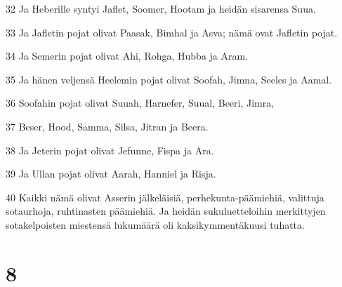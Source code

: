 \par 32 Ja Heberille syntyi Jaflet, Soomer, Hootam ja heidän sisarensa Suua.
\par 33 Ja Jafletin pojat olivat Paasak, Bimhal ja Asva; nämä ovat Jafletin pojat.
\par 34 Ja Semerin pojat olivat Ahi, Rohga, Hubba ja Aram.
\par 35 Ja hänen veljensä Heelemin pojat olivat Soofah, Jimna, Seeles ja Aamal.
\par 36 Soofahin pojat olivat Suuah, Harnefer, Suual, Beeri, Jimra,
\par 37 Beser, Hood, Samma, Silsa, Jitran ja Beera.
\par 38 Ja Jeterin pojat olivat Jefunne, Fispa ja Ara.
\par 39 Ja Ullan pojat olivat Aarah, Hanniel ja Risja.
\par 40 Kaikki nämä olivat Asserin jälkeläisiä, perhekunta-päämiehiä, valittuja sotaurhoja, ruhtinasten päämiehiä. Ja heidän sukuluetteloihin merkittyjen sotakelpoisten miestensä lukumäärä oli kaksikymmentäkuusi tuhatta.

\chapter{8}

